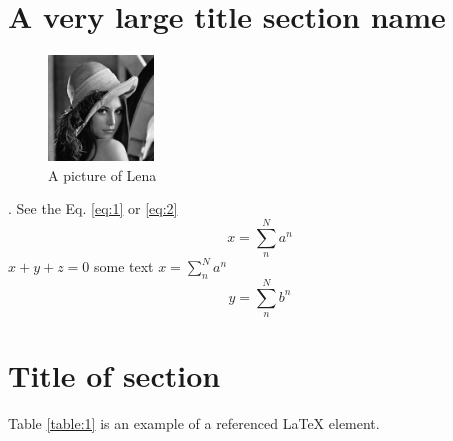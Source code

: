 \documentclass{../class/tae-ufla-article}
\begin{document}
\thispagestyle{empty}
\fontsize{11pt}{14pt}\selectfont

\renewcommand{\taefoottext}{THEORETICAL AND APPLIED ENGINEERING - UFLA - LAVRAS - V7 - N1 - 2023 - P. 1-8}
\renewcommand{\taeheadoddtext}{MULTISENSOR ANALYSIS IN A TEAK REFORESTATION AREA IN THE LEGAL AMAZON, BRAZIL}
\renewcommand{\taeheadeventext}{TRINDADE, L. R. S. L. C. et al.}
\section{A very large title section name}

\lipsum[1-2]
\begin{figure}[!ht]
  \centering
  \includegraphics[width=0.25\textwidth]{screenshot.png}
  \caption{A picture of Lena}
\end{figure}
\lipsum[1]. See the Eq. \ref{eq:1} or \ref{eq:2}
\begin{equation}\label{eq:1}
x=\sum_{n}^{N}a^{n}
\end{equation}
\lipsum[1] $x+y+z=0$ some text $x=\sum_{n}^{N}a^{n}$ \lipsum[1] 
\begin{equation}\label{eq:2}
y=\sum_{n}^{N}b^{n}
\end{equation}

\section{Title of section}
\lipsum[1] 
Table \ref{table:1} is an example of a referenced \LaTeX{} element.
\end{document}
